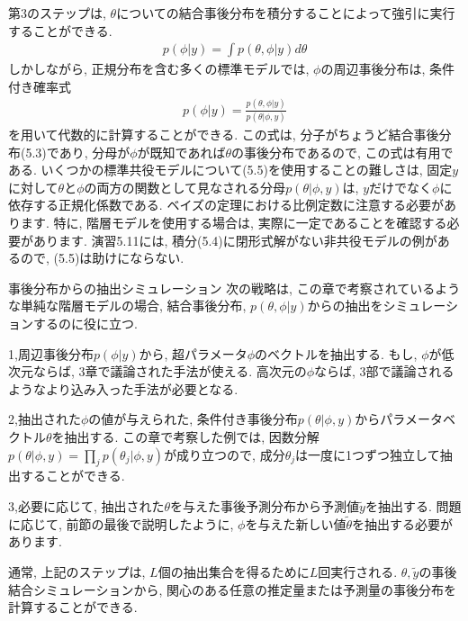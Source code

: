 \documentclass[10pt,dvipdfmx,a4]{beamer}
\newcommand{\eq}[1]{\begin{align}#1\end{align}}
\begin{document}
\begin{frame}
第3のステップは, $\theta$についての結合事後分布を積分することによって強引に実行することができる.
\eq{p(\phi|y)=\int p(\theta,\phi|y)d\theta}
しかしながら, 正規分布を含む多くの標準モデルでは, $\phi$の周辺事後分布は, 条件付き確率式
\eq{p(\phi|y)=\frac{p(\theta,\phi|y)}{p(\theta|\phi,y)}}
を用いて代数的に計算することができる.
この式は, 分子がちょうど結合事後分布(5.3)であり, 分母が$\phi$が既知であれば$\theta$の事後分布であるので, この式は有用である.
いくつかの標準共役モデルについて(5.5)を使用することの難しさは, 固定$y$に対して$\theta$と$\phi$の両方の関数として見なされる分母$p(\theta|\phi, y)$は, $y$だけでなく$\phi$に依存する正規化係数である.
ベイズの定理における比例定数に注意する必要があります.
特に, 階層モデルを使用する場合は, 実際に一定であることを確認する必要があります.
演習5.11には, 積分(5.4)に閉形式解がない非共役モデルの例があるので, (5.5)は助けにならない.
\end{frame}


\begin{frame}{事後分布からの抽出シミュレーション}
次の戦略は, この章で考察されているような単純な階層モデルの場合, 結合事後分布, $p(\theta,\phi|y)$からの抽出をシミュレーションするのに役に立つ.

1,周辺事後分布$p(\phi|y)$から, 超パラメータ$\phi$のベクトルを抽出する.
もし, $\phi$が低次元ならば, 3章で議論された手法が使える.
高次元の$\phi$ならば, 3部で議論されるようなより込み入った手法が必要となる.

2,抽出された$\phi$の値が与えられた, 条件付き事後分布$p(\theta|\phi,y)$からパラメータベクトル$\theta$を抽出する.
この章で考察した例では, 因数分解$p(\theta|\phi, y)=\prod_j p(\theta_j|\phi,y)$が成り立つので, 成分$\theta_j$は一度に1つずつ独立して抽出することができる.

3,必要に応じて, 抽出された$\theta$を与えた事後予測分布から予測値$\tilde{y}$を抽出する.
問題に応じて, 前節の最後で説明したように, $\phi$を与えた新しい値$\tilde{\theta}$を抽出する必要があります.

通常, 上記のステップは, $L$個の抽出集合を得るために$L$回実行される.
$\theta, \tilde{y}$の事後結合シミュレーションから, 関心のある任意の推定量または予測量の事後分布を計算することができる.
\end{frame}

\end{document}
